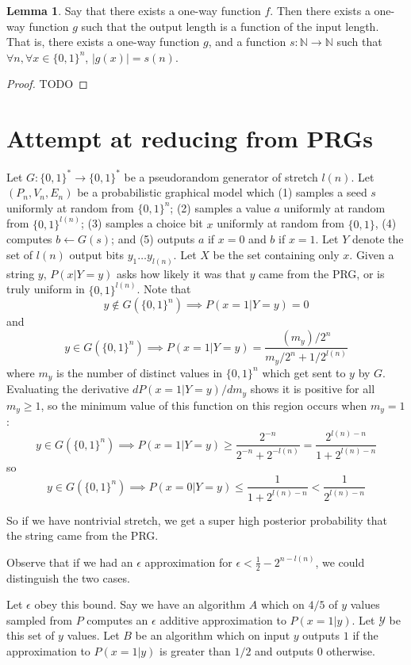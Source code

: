 \documentclass{article}
\def \N {{\mathbb N}}
\theoremstyle{definition}
\newtheorem{lem}[thm]{Lemma}
\theoremstyle{remark}
\begin{document}
\begin{lem} \label{lem:constant_output_length}
Say that there exists a one-way function $f$.
Then there exists a one-way function $g$ such that the output length is a function of the input length.
That is, there exists a one-way function $g$, and a function $s : \N \to \N$ such that $\forall n, \forall x \in \{0, 1\}^n$, $|g(x)| = s(n)$.
\end{lem}
\begin{proof}
    TODO
\end{proof}

\newpage
\section{Attempt at reducing from PRGs}

Let $G : \{0, 1\}^* \to \{0, 1\}^*$ be a pseudorandom generator of stretch $l(n)$.
Let $(P_n, V_n, E_n)$ be a probabilistic graphical model which (1) samples a seed $s$ uniformly at random from $\{0, 1\}^n$; (2) samples a value $a$ uniformly at random from $\{0, 1\}^{l(n)}$; (3) samples a choice bit $x$ uniformly at random from $\{0, 1\}$, (4) computes $b \gets G(s)$; and (5) outputs $a$ if $x = 0$ and $b$ if $x = 1$.
Let $Y$ denote the set of $l(n)$ output bits $y_1 \dots y_{l(n)}$.
Let $X$ be the set containing only $x$.
Given a string $y$, $P(x | Y = y)$ asks how likely it was that $y$ came from the PRG, or is truly uniform in $\{0, 1\}^{l(n)}$.
Note that
$$
y \notin G(\{0, 1\}^n) \implies P(x = 1 | Y = y) = 0
$$
and
$$
y \in G(\{0, 1\}^n) \implies P(x = 1 | Y = y) = \frac{(m_y)/2^n}{m_y/2^n + 1/2^{l(n)}}
$$
where $m_y$ is the number of distinct values in $\{0, 1\}^n$ which get sent to $y$ by $G$.
Evaluating the derivative $dP(x = 1 | Y = y)/dm_y$ shows it is positive for all $m_y \geq 1$, so the minimum value of this function on this region occurs when $m_y = 1$:
$$
y \in G(\{0, 1\}^n) \implies P(x = 1 | Y = y) \geq \frac{2^{-n}}{2^{-n} + 2^{-l(n)}} = \frac{2^{l(n) - n}}{1 + 2^{l(n) - n}}
$$
so
$$
y \in G(\{0, 1\}^n) \implies P(x = 0 | Y = y) \leq \frac{1}{1 + 2^{l(n) - n}} < \frac{1}{2^{l(n) - n}}
$$

So if we have nontrivial stretch, we get a super high posterior probability that the string came from the PRG.

Observe that if we had an $\epsilon$ approximation for $\epsilon < \frac{1}{2} - 2^{n - l(n)}$,
we could distinguish the two cases.

Let $\epsilon$ obey this bound.
Say we have an algorithm $A$ which on $4/5$ of $y$ values sampled from $P$ computes an $\epsilon$ additive approximation to $P(x = 1 | y)$.
Let $\mathcal{Y}$ be this set of $y$ values.
Let $B$ be an algorithm which on input $y$ outputs $1$ if the approximation to $P(x = 1 | y)$ is greater than $1/2$ and outputs 0 otherwise.
\end{document}
